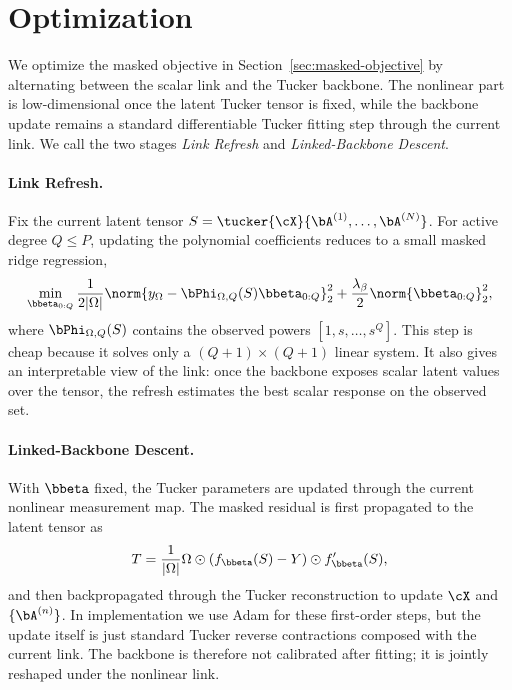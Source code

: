 \section{Optimization}
\label{sec:optimization}

We optimize the masked objective in Section~\ref{sec:masked-objective} by
alternating between the scalar link and the Tucker backbone. The nonlinear part
is low-dimensional once the latent Tucker tensor is fixed, while the backbone
update remains a standard differentiable Tucker fitting step through the
current link. We call the two stages \emph{Link Refresh} and
\emph{Linked-Backbone Descent}.

\paragraph{Link Refresh.}
Fix the current latent tensor $S=\tucker{\cX}{\bA^{(1)},\ldots,\bA^{(N)}}$.
For active degree \(Q\le P\), updating the polynomial coefficients reduces to
a small masked ridge regression,
\begin{equation}
  \min_{\bbeta_{0:Q}}
  \frac{1}{2|\Omega|}
  \norm{y_\Omega-\bPhi_{\Omega,Q}(S)\bbeta_{0:Q}}_2^2
  +
  \frac{\lambda_\beta}{2}\norm{\bbeta_{0:Q}}_2^2,
  \label{eq:main-beta-subproblem}
\end{equation}
where \(\bPhi_{\Omega,Q}(S)\) contains the observed powers
\([1,s,\ldots,s^Q]\). This step is cheap because it solves only a
\((Q+1)\times(Q+1)\) linear system. It also gives an interpretable view of the
link: once the backbone exposes scalar latent values over the tensor, the
refresh estimates the best scalar response on the observed set.

\paragraph{Linked-Backbone Descent.}
With \(\bbeta\) fixed, the Tucker parameters are updated through the current
nonlinear measurement map. The masked residual is first propagated to the
latent tensor as
\begin{equation}
  T=
  \frac{1}{|\Omega|}
  \Omega\odot\left(f_{\bbeta}(S)-Y\right)\odot f'_{\bbeta}(S),
\end{equation}
and then backpropagated through the Tucker reconstruction to update
\(\cX\) and \(\{\bA^{(n)}\}\). In implementation we use Adam for these
first-order steps, but the update itself is just standard Tucker reverse
contractions composed with the current link. The backbone is therefore not
calibrated after fitting; it is jointly reshaped under the nonlinear
link.

